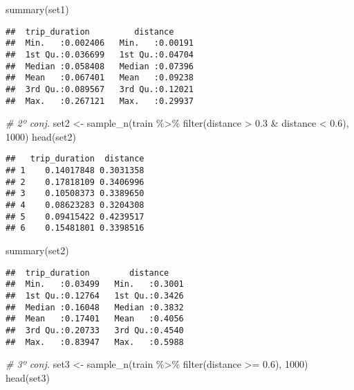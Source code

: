 \documentclass[
]{article}
\newenvironment{Shaded}{\begin{snugshade}}{\end{snugshade}}
\newcommand{\CommentTok}[1]{\textcolor[rgb]{0.56,0.35,0.01}{\textit{#1}}}
\newcommand{\DecValTok}[1]{\textcolor[rgb]{0.00,0.00,0.81}{#1}}
\newcommand{\FloatTok}[1]{\textcolor[rgb]{0.00,0.00,0.81}{#1}}
\newcommand{\FunctionTok}[1]{\textcolor[rgb]{0.00,0.00,0.00}{#1}}
\newcommand{\NormalTok}[1]{#1}
\newcommand{\OtherTok}[1]{\textcolor[rgb]{0.56,0.35,0.01}{#1}}
\newcommand{\SpecialCharTok}[1]{\textcolor[rgb]{0.00,0.00,0.00}{#1}}
\begin{document}
\begin{Shaded}
\begin{Highlighting}[]
\FunctionTok{summary}\NormalTok{(set1)}
\end{Highlighting}
\end{Shaded}

\begin{verbatim}
##  trip_duration         distance      
##  Min.   :0.002406   Min.   :0.00191  
##  1st Qu.:0.036699   1st Qu.:0.04704  
##  Median :0.058408   Median :0.07396  
##  Mean   :0.067401   Mean   :0.09238  
##  3rd Qu.:0.089567   3rd Qu.:0.12021  
##  Max.   :0.267121   Max.   :0.29937
\end{verbatim}

\begin{Shaded}
\begin{Highlighting}[]
\CommentTok{\# 2º conj.}
\NormalTok{set2 }\OtherTok{\textless{}{-}} \FunctionTok{sample\_n}\NormalTok{(train }\SpecialCharTok{\%\textgreater{}\%} \FunctionTok{filter}\NormalTok{(distance }\SpecialCharTok{\textgreater{}} \FloatTok{0.3} \SpecialCharTok{\&}\NormalTok{ distance }\SpecialCharTok{\textless{}} \FloatTok{0.6}\NormalTok{), }\DecValTok{1000}\NormalTok{)}
\FunctionTok{head}\NormalTok{(set2)}
\end{Highlighting}
\end{Shaded}

\begin{verbatim}
##   trip_duration  distance
## 1    0.14017848 0.3031358
## 2    0.17818109 0.3406996
## 3    0.10508373 0.3389650
## 4    0.08623283 0.3204308
## 5    0.09415422 0.4239517
## 6    0.15481801 0.3398516
\end{verbatim}

\begin{Shaded}
\begin{Highlighting}[]
\FunctionTok{summary}\NormalTok{(set2)}
\end{Highlighting}
\end{Shaded}

\begin{verbatim}
##  trip_duration        distance     
##  Min.   :0.03499   Min.   :0.3001  
##  1st Qu.:0.12764   1st Qu.:0.3426  
##  Median :0.16048   Median :0.3832  
##  Mean   :0.17401   Mean   :0.4056  
##  3rd Qu.:0.20733   3rd Qu.:0.4540  
##  Max.   :0.83947   Max.   :0.5988
\end{verbatim}

\begin{Shaded}
\begin{Highlighting}[]
\CommentTok{\# 3º conj.}
\NormalTok{set3 }\OtherTok{\textless{}{-}} \FunctionTok{sample\_n}\NormalTok{(train }\SpecialCharTok{\%\textgreater{}\%} \FunctionTok{filter}\NormalTok{(distance }\SpecialCharTok{\textgreater{}=} \FloatTok{0.6}\NormalTok{), }\DecValTok{1000}\NormalTok{)}
\FunctionTok{head}\NormalTok{(set3)}
\end{Highlighting}
\end{Shaded}
\end{document}
